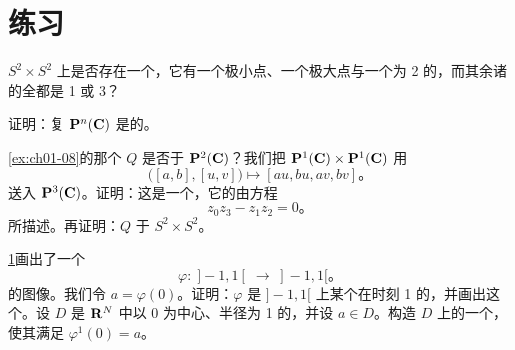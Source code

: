 
\section*{练习}
\label{sec:ch04-exercises}


\begin{exercise}\label{ex:ch04-16}
$S^2\times S^2$ 上是否存在一个\trMorseFunction，它有一个极小点、一个极大点与一个\trIndex{}为 2 的\trCriticalPoint，而其余诸\trCriticalPoint{}的\trIndex{}全都是 1 或 3？
\end{exercise}

\begin{exercise}\label{ex:ch04-17}
证明：复\trProjectiveSpace{} $\mathbf{P}^n(\mathbf{C})$ 是\trSimplyConnected{}的。
\end{exercise}

\begin{exercise}\label{ex:ch04-18}
\cref{ex:ch01-08}的那个\trQuadric{} $Q$ 是否\trDiffeomorphic{}于 $\mathbf{P}^2(\mathbf{C})$？我们把 $\mathbf{P}^1(\mathbf{C})\times\mathbf{P}^1(\mathbf{C})$ 用
\[
\bigl([a,b],[u,v]\bigr)\longmapsto[au,bu,av,bv]\text{。}
\]
送入 $\mathbf{P}^3(\mathbf{C})$。证明：这是一个\trEmbedding，它的\trImage{}由方程
\[
z_0z_3-z_1z_2=0\text{。}
\]
所描述。再证明：$Q$ \trDiffeomorphic{}于 $S^2\times S^2$。
\end{exercise}

\begin{exercise}\label{ex:ch04-19}
\cref{fig:diffeomorphism-graph}画出了一个\trDiffeomorphism
\[
\varphi:\;]-1,1[\;\longrightarrow\;]-1,1[\text{。}
\]
的图像。我们令 $a=\varphi(0)$。证明：$\varphi$ 是 $]-1,1[$ 上某个\trVectorField{}在时刻 1 的\trFlow，并画出这个\trVectorField。设 $D$ 是 $\mathbf{R}^N$ 中以 $0$ 为中心、半径为 1 的\trOpen{}\trDisk，并设 $a\in D$。构造 $D$ 上的一个\trVectorField，使其\trFlow{}满足 $\varphi^1(0)=a$。
\end{exercise}

\setcounter{figure}{11}%
\begin{figure}[htbp]
\centering
{}
\caption{}
\label{fig:diffeomorphism-graph}
\end{figure}

